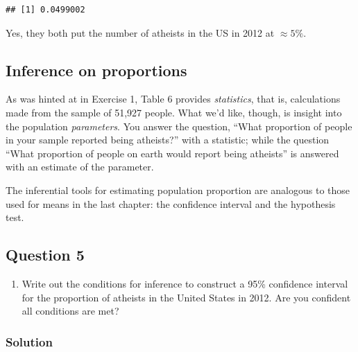 \documentclass[]{article}
\newenvironment{Shaded}{\begin{snugshade}}{\end{snugshade}}
\newcommand{\KeywordTok}[1]{\textcolor[rgb]{0.13,0.29,0.53}{\textbf{#1}}}
\newcommand{\StringTok}[1]{\textcolor[rgb]{0.31,0.60,0.02}{#1}}
\newcommand{\OperatorTok}[1]{\textcolor[rgb]{0.81,0.36,0.00}{\textbf{#1}}}
\newcommand{\NormalTok}[1]{#1}
\providecommand{\tightlist}{%
  \setlength{\itemsep}{0pt}\setlength{\parskip}{0pt}}
\begin{document}
\begin{Shaded}
\end{Shaded}

\begin{verbatim}
## [1] 0.0499002
\end{verbatim}

Yes, they both put the number of atheists in the US in 2012 at
\(\approx 5\%\).

\subsection{Inference on proportions}\label{inference-on-proportions}

As was hinted at in Exercise 1, Table 6 provides \emph{statistics}, that
is, calculations made from the sample of 51,927 people. What we'd like,
though, is insight into the population \emph{parameters}. You answer the
question, ``What proportion of people in your sample reported being
atheists?'' with a statistic; while the question ``What proportion of
people on earth would report being atheists'' is answered with an
estimate of the parameter.

The inferential tools for estimating population proportion are analogous
to those used for means in the last chapter: the confidence interval and
the hypothesis test.

\subsection{Question 5}\label{question-5}

\begin{enumerate}
\def\labelenumi{\arabic{enumi}.}
\setcounter{enumi}{4}
\tightlist
\item
  Write out the conditions for inference to construct a 95\% confidence
  interval for the proportion of atheists in the United States in 2012.
  Are you confident all conditions are met?
\end{enumerate}

\subsubsection{Solution}\label{solution-4}
\end{document}
